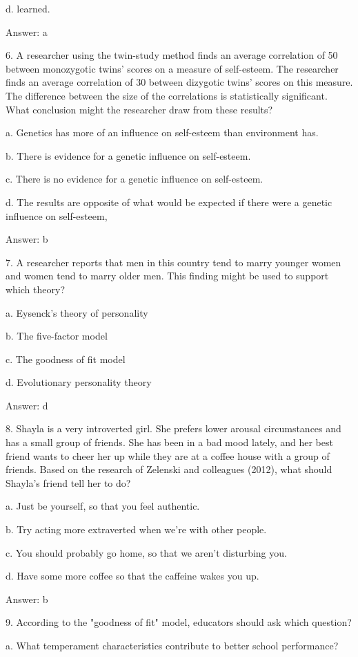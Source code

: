 \documentclass{article}
\begin{document}
d. learned.

Answer: a

6. A researcher using the twin-study method finds an average correlation of 50 between monozygotic twins' scores on a measure of self-esteem. The researcher finds an average correlation of 30 between dizygotic twins' scores on this measure. The difference between the size of the correlations is statistically significant. What conclusion might the researcher draw from these results?

a. Genetics has more of an influence on self-esteem than environment has.

b. There is evidence for a genetic influence on self-esteem.

c. There is no evidence for a genetic influence on self-esteem.

d. The results are opposite of what would be expected if there were a genetic influence on self-esteem,

Answer: b

7. A researcher reports that men in this country tend to marry younger women and women tend to marry older men. This finding might be used to support which theory?

a. Eysenck's theory of personality

b. The five-factor model

c. The goodness of fit model

d. Evolutionary personality theory

Answer: d

8. Shayla is a very introverted girl. She prefers lower arousal circumstances and has a small group of friends. She has been in a bad mood lately, and her best friend wants to cheer her up while they are at a coffee house with a group of friends. Based on the research of Zelenski and colleagues (2012), what should Shayla's friend tell her to do?

a. Just be yourself, so that you feel authentic.

b. Try acting more extraverted when we're with other people.

c. You should probably go home, so that we aren't disturbing you.

d. Have some more coffee so that the caffeine wakes you up.

Answer: b

9. According to the "goodness of fit" model, educators should ask which question?

a. What temperament characteristics contribute to better school performance?
\end{document}
